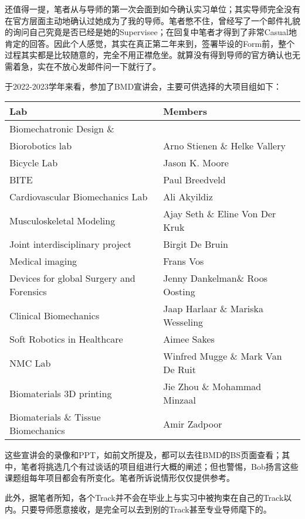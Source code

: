 还值得一提，笔者从与导师的第一次会面到如今确认实习单位；其实导师完全没有在官方层面主动地确认过她成为了我的导师。笔者憋不住，曾经写了一个邮件礼貌的询问自己究竟是否已经是她的Supervisee；在回复中笔者才得到了非常Casual地肯定的回答。因此个人感觉，其实在真正第二年来到，签署毕设的Form前，整个过程其实都是比较随意的，完全不用正襟危坐。就算没有得到导师的官方确认也无需着急，实在不放心发邮件问一下就行了。

于2022-2023学年来看，参加了BMD宣讲会，主要可供选择的大项目组如下：

\begin{center}
\begin{tabular*}{\textwidth}{@{\extracolsep{\fill}} p{} | p{}}
\textbf{Lab} & \textbf{Members} \\
\hline
Biomechatronic Design \& \\Biorobotics lab & Arno Stienen \& Helke Vallery \\
\hline
Bicycle Lab & Jason K. Moore \\
\hline
BITE & Paul Breedveld \\
\hline
Cardiovascular Biomechanics Lab & Ali Akyildiz \\
\hline
Musculoskeletal Modeling & Ajay Seth \& Eline Von Der Kruk \\
\hline
Joint interdisciplinary project & Birgit De Bruin \\
\hline
Medical imaging & Frans Vos \\
\hline
Devices for global Surgery and Forensics & Jenny Dankelman\& Roos Oosting \\
\hline
Clinical Biomechanics & Jaap Harlaar \& Mariska Wesseling \\
\hline
Soft Robotics in Healthcare & Aimee Sakes \\
\hline
NMC Lab & Winfred Mugge \& Mark Van De Ruit \\
\hline
Biomaterials 3D printing & Jie Zhou \& Mohammad Minzaal \\
\hline
Biomaterials \& Tissue Biomechanics & Amir Zadpoor \\
\end{tabular*}
\end{center}

这些宣讲会的录像和PPT，如前文所提及，都可以去往BMD的BS页面查看；其中，笔者将挑选几个有过谈话的项目组进行大概的阐述；但也警惕，Bob扬言这些课题组每年项目都会有所变化。笔者所诉说情形仅仅提供参考。

此外，据笔者所知，各个Track并不会在毕业上与实习中被拘束在自己的Track以内。只要导师愿意接收，是完全可以去到别的Track甚至专业导师麾下的。

